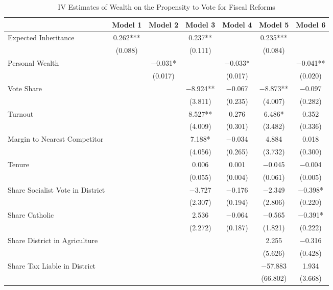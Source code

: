 \begin{table}

\caption{\label{tab:ivresults_fisc_inherit}IV Estimates of Wealth on the Propensity to Vote for Fiscal Reforms}
\centering
\begin{tabular}[t]{lcccccc}
\toprule
  & Model 1 & Model 2 & Model 3 & Model 4 & Model 5 & Model 6\\
\midrule
Expected Inheritance & \num{0.262}*** &  & \num{0.237}** &  & \num{0.235}*** & \\
 & (\num{0.088}) &  & (\num{0.111}) &  & (\num{0.084}) & \\
Personal Wealth &  & \num{-0.031}* &  & \num{-0.033}* &  & \num{-0.041}**\\
 &  & (\num{0.017}) &  & (\num{0.017}) &  & (\num{0.020})\\
Vote Share &  &  & \num{-8.924}** & \num{-0.067} & \num{-8.873}** & \num{-0.097}\\
 &  &  & (\num{3.811}) & (\num{0.235}) & (\num{4.007}) & (\num{0.282})\\
Turnout &  &  & \num{8.527}** & \num{0.276} & \num{6.486}* & \num{0.352}\\
 &  &  & (\num{4.009}) & (\num{0.301}) & (\num{3.482}) & (\num{0.336})\\
Margin to Nearest Competitor &  &  & \num{7.188}* & \num{-0.034} & \num{4.884} & \num{0.018}\\
 &  &  & (\num{4.056}) & (\num{0.265}) & (\num{3.732}) & (\num{0.300})\\
Tenure &  &  & \num{0.006} & \num{0.001} & \num{-0.045} & \num{-0.004}\\
 &  &  & (\num{0.055}) & (\num{0.004}) & (\num{0.061}) & (\num{0.005})\\
Share Socialist Vote in District &  &  & \num{-3.727} & \num{-0.176} & \num{-2.349} & \num{-0.398}*\\
 &  &  & (\num{2.307}) & (\num{0.194}) & (\num{2.806}) & (\num{0.220})\\
Share Catholic &  &  & \num{2.536} & \num{-0.064} & \num{-0.565} & \num{-0.391}*\\
 &  &  & (\num{2.272}) & (\num{0.187}) & (\num{1.821}) & (\num{0.222})\\
Share District in Agriculture &  &  &  &  & \num{2.255} & \num{-0.316}\\
 &  &  &  &  & (\num{5.626}) & (\num{0.428})\\
Share Tax Liable in District &  &  &  &  & \num{-57.883} & \num{1.934}\\
 &  &  &  &  & (\num{66.802}) & (\num{3.668})\\

\end{tabular}
\end{table}
